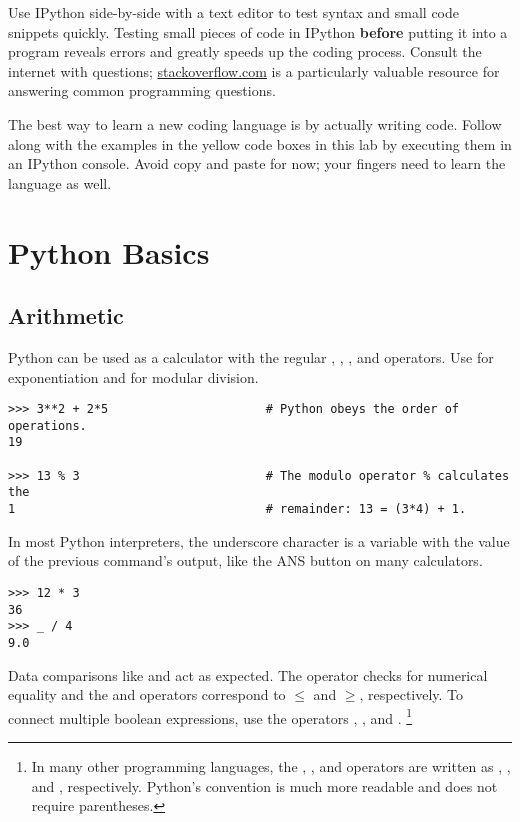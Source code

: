 \begin{info}
Use IPython side-by-side with a text editor to test syntax and small code snippets quickly.
Testing small pieces of code in IPython \textbf{before} putting it into a program reveals errors and greatly speeds up the coding process.
Consult the internet with questions; \href{http://stackoverflow.com/}{stackoverflow.com} is a particularly valuable resource for answering common programming questions.

The best way to learn a new coding language is by actually writing code.
Follow along with the examples in the yellow code boxes in this lab by executing them in an IPython console.
Avoid copy and paste for now; your fingers need to learn the language as well.
\end{info}

\section*{Python Basics} %

\subsection*{Arithmetic} %

Python can be used as a calculator with the regular \li{+}, \li{-}, \li{*}, and \li{/} operators.
Use \li{**} for exponentiation and \li{\%} for modular division.

\begin{lstlisting}
>>> 3**2 + 2*5                      # Python obeys the order of operations.
19

>>> 13 % 3                          # The modulo operator % calculates the
1                                   # remainder: 13 = (3*4) + 1.
\end{lstlisting}

In most Python interpreters, the underscore character \li{\_} is a variable with the value of the previous command's output, like the ANS button on many calculators.

\begin{lstlisting}
>>> 12 * 3
36
>>> _ / 4
9.0
\end{lstlisting}

Data comparisons like \li{<} and \li{>} act as expected.
The \li{==} operator checks for numerical equality and the \li{<=} and \li{>=} operators correspond to $\le$ and $\ge$, respectively.
To connect multiple boolean expressions, use the operators , , and .%
\footnote{In many other programming languages, the , , and  operators are written as \lif{&&}, \lif{||}, and \lif{!}, respectively. Python's convention is much more readable and does not require parentheses.}

